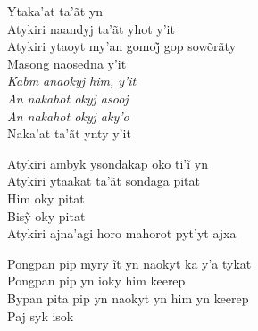  \smallskip
 \begin{center}\end{center}
 \smallskip
 
\noindent   Ytaka'at ta'ãt yn\\
  Atykiri naandyj ta'ãt yhot y'it\\
  Atykiri ytaoyt my’an gomoj̃ gop sowõrãty\\
  Masong naosedna y'it\\
  \textit{Kabm anaokyj him, y'it}\\
  \textit{An nakahot okyj asooj}\\
  \textit{An nakahot okyj aky'o}\\
  Naka'at ta'ãt ynty y'it
 
 \smallskip
 \begin{center}\end{center}
 \smallskip
 
\noindent   Atykiri ambyk ysondakap oko ti’ĩ yn\\
  Atykiri ytaakat ta'ãt sondaga pitat\\
  Him oky pitat\\
  Bisỹ oky pitat\\
  Atykiri ajna'agi horo mahorot pyt'yt ajxa
 
 \smallskip
 \begin{center}\end{center}
 \smallskip
 
\noindent   Pongpan pip myry ĩt yn naokyt ka y’a tykat\\
  Pongpan pip yn ioky him keerep\\
  Bypan pita pip yn naokyt yn him yn keerep\\
  Paj syk isok
 
